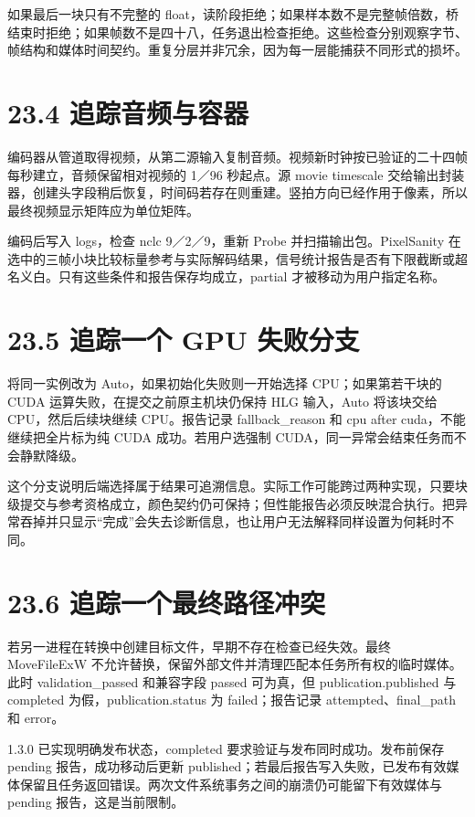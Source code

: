\documentclass[UTF8,zihao=-4,openany]{ctexbook}
\begin{document}
如果最后一块只有不完整的 float，读阶段拒绝；如果样本数不是完整帧倍数，桥结束时拒绝；如果帧数不是四十八，任务退出检查拒绝。这些检查分别观察字节、帧结构和媒体时间契约。重复分层并非冗余，因为每一层能捕获不同形式的损坏。


\section*{23.4 追踪音频与容器}
编码器从管道取得视频，从第二源输入复制音频。视频新时钟按已验证的二十四帧每秒建立，音频保留相对视频的 1／96 秒起点。源 movie timescale 交给输出封装器，创建头字段稍后恢复，时间码若存在则重建。竖拍方向已经作用于像素，所以最终视频显示矩阵应为单位矩阵。

编码后写入 logs，检查 nclc 9／2／9，重新 Probe 并扫描输出包。PixelSanity 在选中的三帧小块比较标量参考与实际解码结果，信号统计报告是否有下限截断或超名义白。只有这些条件和报告保存均成立，partial 才被移动为用户指定名称。


\section*{23.5 追踪一个 GPU 失败分支}
将同一实例改为 Auto，如果初始化失败则一开始选择 CPU；如果第若干块的 CUDA 运算失败，在提交之前原主机块仍保持 HLG 输入，Auto 将该块交给 CPU，然后后续块继续 CPU。报告记录 fallback\_reason 和 cpu after cuda，不能继续把全片标为纯 CUDA 成功。若用户选强制 CUDA，同一异常会结束任务而不会静默降级。

这个分支说明后端选择属于结果可追溯信息。实际工作可能跨过两种实现，只要块级提交与参考资格成立，颜色契约仍可保持；但性能报告必须反映混合执行。把异常吞掉并只显示“完成”会失去诊断信息，也让用户无法解释同样设置为何耗时不同。


\section*{23.6 追踪一个最终路径冲突}
若另一进程在转换中创建目标文件，早期不存在检查已经失效。最终 MoveFileExW 不允许替换，保留外部文件并清理匹配本任务所有权的临时媒体。此时 validation\_passed 和兼容字段 passed 可为真，但 publication.published 与 completed 为假，publication.status 为 failed；报告记录 attempted、final\_path 和 error。

1.3.0 已实现明确发布状态，completed 要求验证与发布同时成功。发布前保存 pending 报告，成功移动后更新 published；若最后报告写入失败，已发布有效媒体保留且任务返回错误。两次文件系统事务之间的崩溃仍可能留下有效媒体与 pending 报告，这是当前限制。
\end{document}

